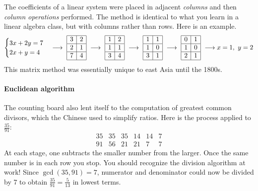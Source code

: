 The coefficients of a linear system were placed in adjacent \emph{columns} and then \emph{column operations} performed. The method is identical to what you learn in a linear algebra class, but with columns rather than rows. Here is an example.
\[
	\begin{cases}
		3x+2y=7\\
		2x+y=4
	\end{cases}
	\longrightarrow\ 
	\begin{array}{|c|c|c|c|c|}
	  \hline
	  3&2\\\hline
	  2&1\\\hline
	  7&4\\\hline
  \end{array}
  \ \longrightarrow\ 
	\begin{array}{|c|c|c|c|c|}
	  \hline
	  1&2\\\hline
	  1&1\\\hline
	  3&4\\\hline
  \end{array}
  \ \longrightarrow\ 
	\begin{array}{|c|c|c|c|c|}
	  \hline
	  1&1\\\hline
	  1&0\\\hline
	  3&1\\\hline
  \end{array}
  \ \longrightarrow\ 
	\begin{array}{|c|c|c|c|c|}
	  \hline
	  0&1\\\hline
	  1&0\\\hline
	  2&1\\\hline
  \end{array}
  \ \longrightarrow x=1,\ y=2
\]
This matrix method was essentially unique to east Asia until the 1800s.

\paragraph{Euclidean algorithm}

The counting board also lent itself to the computation of greatest common divisors, which the Chinese used to simplify ratios. Here is the process applied to $\frac{35}{91}$:
\[
	\begin{array}{llllllll}
		35&35&35&14&14&7\\
		91&56&21&21&7&7
	\end{array}
\]
At each stage, one subtracts the smaller number from the larger. Once the same number is in each row you stop. You should recognize the division algorithm at work! Since $\gcd(35,91)=7$, numerator and denominator could now be divided by 7 to obtain $\frac{35}{91}=\frac 5{13}$ in lowest terms.

